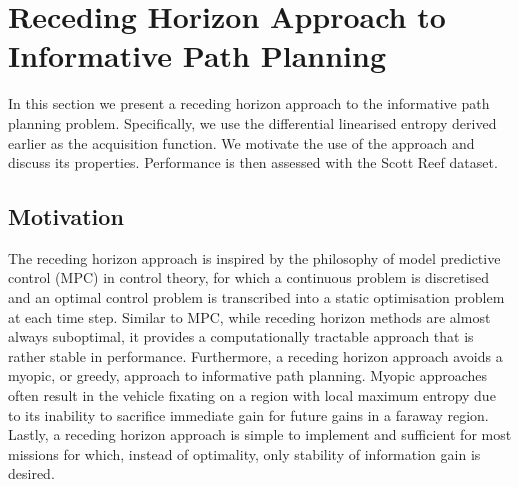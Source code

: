 \documentclass{article}
\begin{document}
\section{Receding Horizon Approach to Informative Path Planning}
\label{Section:RecedingHorizonFormulation}

	In this section we present a receding horizon approach to the informative path planning problem. Specifically, we use the differential linearised entropy derived earlier as the acquisition function. We motivate the use of the approach and discuss its properties. Performance is then assessed with the Scott Reef dataset.
	
	\subsection{Motivation}
	
		The receding horizon approach is inspired by the philosophy of model predictive control (MPC) in control theory, for which a continuous problem is discretised and an optimal control problem is transcribed into a static optimisation problem at each time step. Similar to MPC, while receding horizon methods are almost always suboptimal, it provides a computationally tractable approach that is rather stable in performance. Furthermore, a receding horizon approach avoids a myopic, or greedy, approach to informative path planning. Myopic approaches often result in the vehicle fixating on a region with local maximum entropy due to its inability to sacrifice immediate gain for future gains in a faraway region. Lastly, a receding horizon approach is simple to implement and sufficient for most missions for which, instead of optimality, only stability of information gain is desired. 
		
\end{document}
